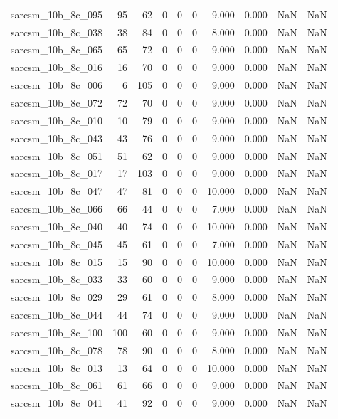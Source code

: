 \documentclass{article}
\begin{document}
\begin{longtable}{lrrrrrrrrr}
sarcsm\_10b\_8c\_095 & 95 & 62 & 0 & 0 & 0 & 9.000 & 0.000 & NaN & NaN \\
sarcsm\_10b\_8c\_038 & 38 & 84 & 0 & 0 & 0 & 8.000 & 0.000 & NaN & NaN \\
sarcsm\_10b\_8c\_065 & 65 & 72 & 0 & 0 & 0 & 9.000 & 0.000 & NaN & NaN \\
sarcsm\_10b\_8c\_016 & 16 & 70 & 0 & 0 & 0 & 9.000 & 0.000 & NaN & NaN \\
sarcsm\_10b\_8c\_006 & 6 & 105 & 0 & 0 & 0 & 9.000 & 0.000 & NaN & NaN \\
sarcsm\_10b\_8c\_072 & 72 & 70 & 0 & 0 & 0 & 9.000 & 0.000 & NaN & NaN \\
sarcsm\_10b\_8c\_010 & 10 & 79 & 0 & 0 & 0 & 9.000 & 0.000 & NaN & NaN \\
sarcsm\_10b\_8c\_043 & 43 & 76 & 0 & 0 & 0 & 9.000 & 0.000 & NaN & NaN \\
sarcsm\_10b\_8c\_051 & 51 & 62 & 0 & 0 & 0 & 9.000 & 0.000 & NaN & NaN \\
sarcsm\_10b\_8c\_017 & 17 & 103 & 0 & 0 & 0 & 9.000 & 0.000 & NaN & NaN \\
sarcsm\_10b\_8c\_047 & 47 & 81 & 0 & 0 & 0 & 10.000 & 0.000 & NaN & NaN \\
sarcsm\_10b\_8c\_066 & 66 & 44 & 0 & 0 & 0 & 7.000 & 0.000 & NaN & NaN \\
sarcsm\_10b\_8c\_040 & 40 & 74 & 0 & 0 & 0 & 10.000 & 0.000 & NaN & NaN \\
sarcsm\_10b\_8c\_045 & 45 & 61 & 0 & 0 & 0 & 7.000 & 0.000 & NaN & NaN \\
sarcsm\_10b\_8c\_015 & 15 & 90 & 0 & 0 & 0 & 10.000 & 0.000 & NaN & NaN \\
sarcsm\_10b\_8c\_033 & 33 & 60 & 0 & 0 & 0 & 9.000 & 0.000 & NaN & NaN \\
sarcsm\_10b\_8c\_029 & 29 & 61 & 0 & 0 & 0 & 8.000 & 0.000 & NaN & NaN \\
sarcsm\_10b\_8c\_044 & 44 & 74 & 0 & 0 & 0 & 9.000 & 0.000 & NaN & NaN \\
sarcsm\_10b\_8c\_100 & 100 & 60 & 0 & 0 & 0 & 9.000 & 0.000 & NaN & NaN \\
sarcsm\_10b\_8c\_078 & 78 & 90 & 0 & 0 & 0 & 8.000 & 0.000 & NaN & NaN \\
sarcsm\_10b\_8c\_013 & 13 & 64 & 0 & 0 & 0 & 10.000 & 0.000 & NaN & NaN \\
sarcsm\_10b\_8c\_061 & 61 & 66 & 0 & 0 & 0 & 9.000 & 0.000 & NaN & NaN \\
sarcsm\_10b\_8c\_041 & 41 & 92 & 0 & 0 & 0 & 9.000 & 0.000 & NaN & NaN \\

\end{longtable}
\end{document}
